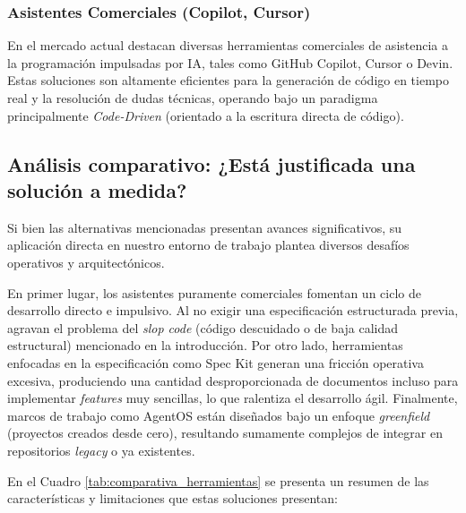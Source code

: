 \documentclass[11pt, letterpaper]{article}
\begin{document}
\subsubsection{Asistentes Comerciales (Copilot, Cursor)}
En el mercado actual destacan diversas herramientas comerciales de asistencia a la programación impulsadas por IA, tales como GitHub Copilot, Cursor o Devin. Estas soluciones son altamente eficientes para la generación de código en tiempo real y la resolución de dudas técnicas, operando bajo un paradigma principalmente \textit{Code-Driven} (orientado a la escritura directa de código). \cite{github_copilot_docs} \cite{cursor_ai} \cite{chen_codex_2021} \cite{peng_copilot_2023}
\subsection{Análisis comparativo: ¿Está justificada una solución a medida?}

Si bien las alternativas mencionadas presentan avances significativos, su aplicación directa en nuestro entorno de trabajo plantea diversos desafíos operativos y arquitectónicos. 

En primer lugar, los asistentes puramente comerciales fomentan un ciclo de desarrollo directo e impulsivo. Al no exigir una especificación estructurada previa, agravan el problema del \textit{slop code} (código descuidado o de baja calidad estructural) mencionado en la introducción. Por otro lado, herramientas enfocadas en la especificación como Spec Kit generan una fricción operativa excesiva, produciendo una cantidad desproporcionada de documentos incluso para implementar \textit{features} muy sencillas, lo que ralentiza el desarrollo ágil. Finalmente, marcos de trabajo como AgentOS están diseñados bajo un enfoque \textit{greenfield} (proyectos creados desde cero), resultando sumamente complejos de integrar en repositorios \textit{legacy} o ya existentes.

En el Cuadro \ref{tab:comparativa_herramientas} se presenta un resumen de las características y limitaciones que estas soluciones presentan:
\end{document}
